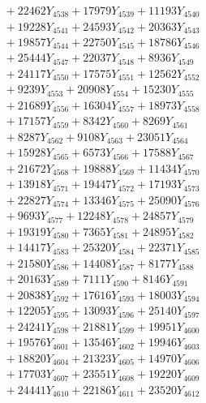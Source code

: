 \documentclass[a4paper,10pt]{article}
\begin{document}
{\begin{align}
&\;  + 22462 Y_{4538} + 17979 Y_{4539} + 11193 Y_{4540} \\[0.3ex]
&\;  + 19228 Y_{4541} + 24593 Y_{4542} + 20363 Y_{4543} \\[0.3ex]
&\;  + 19857 Y_{4544} + 22750 Y_{4545} + 18786 Y_{4546} \\[0.3ex]
&\;  + 25444 Y_{4547} + 22037 Y_{4548} + 8936 Y_{4549} \\[0.3ex]
&\;  + 24117 Y_{4550} + 17575 Y_{4551} + 12562 Y_{4552} \\[0.3ex]
&\;  + 9239 Y_{4553} + 20908 Y_{4554} + 15230 Y_{4555} \\[0.3ex]
&\;  + 21689 Y_{4556} + 16304 Y_{4557} + 18973 Y_{4558} \\[0.5ex]\allowbreak
&\;  + 17157 Y_{4559} + 8342 Y_{4560} + 8269 Y_{4561} \\[0.3ex]
&\;  + 8287 Y_{4562} + 9108 Y_{4563} + 23051 Y_{4564} \\[0.3ex]
&\;  + 15928 Y_{4565} + 6573 Y_{4566} + 17588 Y_{4567} \\[0.3ex]
&\;  + 21672 Y_{4568} + 19888 Y_{4569} + 11434 Y_{4570} \\[0.3ex]
&\;  + 13918 Y_{4571} + 19447 Y_{4572} + 17193 Y_{4573} \\[0.3ex]
&\;  + 22827 Y_{4574} + 13346 Y_{4575} + 25090 Y_{4576} \\[0.3ex]
&\;  + 9693 Y_{4577} + 12248 Y_{4578} + 24857 Y_{4579} \\[0.3ex]
&\;  + 19319 Y_{4580} + 7365 Y_{4581} + 24895 Y_{4582} \\[0.3ex]
&\;  + 14417 Y_{4583} + 25320 Y_{4584} + 22371 Y_{4585} \\[0.3ex]
&\;  + 21580 Y_{4586} + 14408 Y_{4587} + 8177 Y_{4588} \\[0.5ex]\allowbreak
&\;  + 20163 Y_{4589} + 7111 Y_{4590} + 8146 Y_{4591} \\[0.3ex]
&\;  + 20838 Y_{4592} + 17616 Y_{4593} + 18003 Y_{4594} \\[0.3ex]
&\;  + 12205 Y_{4595} + 13093 Y_{4596} + 25140 Y_{4597} \\[0.3ex]
&\;  + 24241 Y_{4598} + 21881 Y_{4599} + 19951 Y_{4600} \\[0.3ex]
&\;  + 19576 Y_{4601} + 13546 Y_{4602} + 19946 Y_{4603} \\[0.3ex]
&\;  + 18820 Y_{4604} + 21323 Y_{4605} + 14970 Y_{4606} \\[0.3ex]
&\;  + 17703 Y_{4607} + 23551 Y_{4608} + 19220 Y_{4609} \\[0.3ex]
&\;  + 24441 Y_{4610} + 22186 Y_{4611} + 23520 Y_{4612} \\[0.3ex]

\end{align}}
\end{document}
